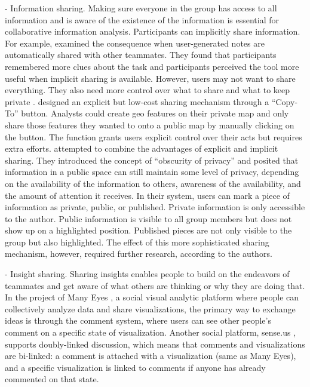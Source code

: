 - Information sharing. Making sure everyone in the group has access to all information and is aware of the existence of the information is essential for collaborative information analysis. Participants can implicitly share information. For example, \cite{Goyal2014} examined the consequence when user-generated notes are automatically shared with other teammates. They found that participants remembered more clues about the task and participants perceived the tool more useful when implicit sharing is available. However, users may not want to share everything. They also need more control over what to share and what to keep private \citep{Mahyar2013b}. \cite{Convertino2011} designed an explicit but low-cost sharing mechanism through a “Copy-To” button. Analysts could create geo features on their private map and only share those features they wanted to onto a public map by manually clicking on the button. The function grants users explicit control over their acts but requires extra efforts. \cite{Nobarany2012} attempted to combine the advantages of explicit and implicit sharing. They introduced the concept of “obscurity of privacy” and posited that information in a public space can still maintain some level of privacy, depending on the availability of the information to others, awareness of the availability, and the amount of attention it receives. In their system, users can mark a piece of information as private, public, or published. Private information is only accessible to the author. Public information is visible to all group members but does not show up on a highlighted position. Published pieces are not only visible to the group but also highlighted. The effect of this more sophisticated sharing mechanism, however, required further research, according to the authors. 

- Insight sharing. Sharing insights enables people to build on the endeavors of teammates and get aware of what others are thinking or why they are doing that. In the project of Many Eyes \citep{Viegas2007}, a social visual analytic platform where people can collectively analyze data and share visualizations, the primary way to exchange ideas is through the comment system, where users can see other people’s comment on a specific state of visualization. Another social platform, sense.us \citep{Heer2008a}, supports doubly-linked discussion, which means that comments and visualizations are bi-linked: a comment is attached with a visualization (same as Many Eyes), and a specific visualization is linked to comments if anyone has already commented on that state. 

